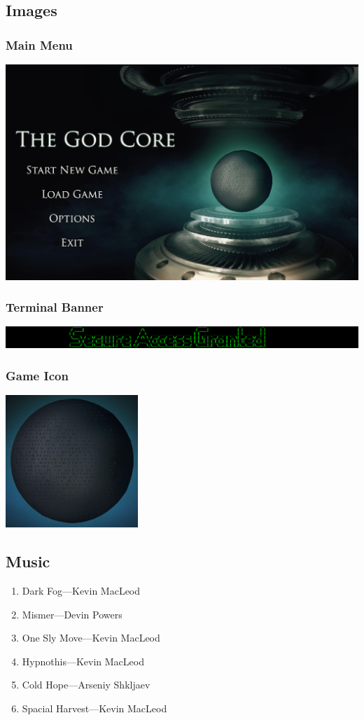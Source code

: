 \documentclass{article}
\begin{document}
\small{}
\subsection{Images} \label{subsec:images}

\subsubsection{Main Menu}
	\includegraphics[width=18cm]{../Resources/Images/Main}
\subsubsection{Terminal Banner}
	\includegraphics[width=18cm]{../Resources/Images/banner}
\subsubsection{Game Icon}
	\includegraphics[width=5cm]{../Resources/Images/Core}
	
\subsection{Music}

\begin{enumerate}
	\item Dark Fog---Kevin MacLeod
	\item Mismer---Devin Powers
	\item One Sly Move---Kevin MacLeod
	\item Hypnothis---Kevin MacLeod
	\item Cold Hope---Arseniy Shkljaev
	\item Spacial Harvest---Kevin MacLeod
\end{enumerate}
\end{document}

